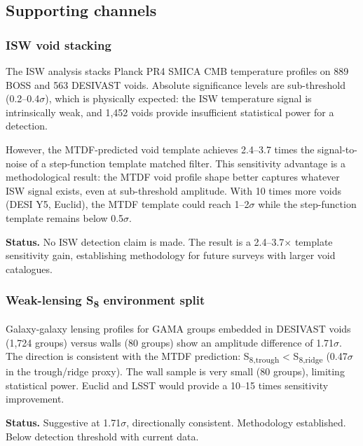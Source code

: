 \documentclass[11pt,a4paper]{article}
\begin{document}
\subsection{Supporting channels}

\subsubsection{ISW void stacking}
The ISW analysis stacks Planck PR4 SMICA CMB temperature profiles on 889 BOSS and 563 DESIVAST voids. Absolute significance levels are sub-threshold (0.2--0.4\(\sigma\)), which is physically expected: the ISW temperature signal is intrinsically weak, and 1,452 voids provide insufficient statistical power for a detection.

However, the MTDF-predicted void template achieves 2.4--3.7 times the signal-to-noise of a step-function template matched filter. This sensitivity advantage is a methodological result: the MTDF void profile shape better captures whatever ISW signal exists, even at sub-threshold amplitude. With 10 times more voids (DESI Y5, Euclid), the MTDF template could reach 1--2\(\sigma\) while the step-function template remains below 0.5\(\sigma\).

\begin{mdframed}[linecolor=accent,linewidth=0.5pt,backgroundcolor=callout-bg,leftline=true,rightline=true,topline=true,bottomline=true,innerleftmargin=8pt,innerrightmargin=8pt,innertopmargin=6pt,innerbottommargin=6pt]
\textbf{Status.} No ISW detection claim is made. The result is a 2.4--3.7$\times$ template sensitivity gain, establishing methodology for future surveys with larger void catalogues.
\end{mdframed}

\subsubsection{Weak-lensing S\textsubscript{8} environment split}
Galaxy-galaxy lensing profiles for GAMA groups embedded in DESIVAST voids (1,724 groups) versus walls (80 groups) show an amplitude difference of 1.71\(\sigma\). The direction is consistent with the MTDF prediction: S\textsubscript{8,trough} < S\textsubscript{8,ridge} (0.47\(\sigma\) in the trough/\allowbreak{}ridge proxy). The wall sample is very small (80 groups), limiting statistical power. Euclid and LSST would provide a 10--15 times sensitivity improvement.

\begin{mdframed}[linecolor=accent,linewidth=0.5pt,backgroundcolor=callout-bg,leftline=true,rightline=true,topline=true,bottomline=true,innerleftmargin=8pt,innerrightmargin=8pt,innertopmargin=6pt,innerbottommargin=6pt]
\textbf{Status.} Suggestive at 1.71\(\sigma\), directionally consistent. Methodology established. Below detection threshold with current data.
\end{mdframed}
\end{document}
